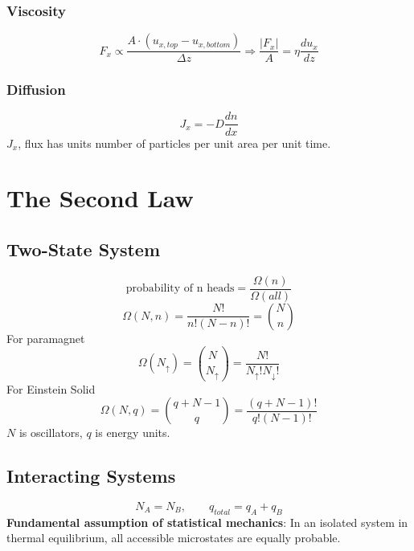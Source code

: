\documentclass[a4paper,norsk, 10pt]{article}
\begin{document}
\subsubsection{Viscosity}
\begin{equation}
F_x \propto \frac{A\cdot (u_{x,top}- u_{x,bottom})}{\Delta z} \Rightarrow \frac{|F_x|}{A} = \eta \frac{du_x}{dz}
\end{equation}

\subsubsection{Diffusion}
\begin{equation}
J_x = -D\frac{dn}{dx}
\end{equation}
$J_x$, flux has units number of particles per unit area per unit time.

\section{The Second Law}
\subsection{Two-State System}
\begin{equation}
\text{probability of n heads} = \frac{\Omega(n)}{\Omega(all)}
\end{equation}
\begin{equation}
\Omega(N,n) = \frac{N!}{n!(N-n)!} = \binom{N}{n}
\end{equation}
For paramagnet
\begin{equation}
\Omega(N_{\uparrow}) = \binom{N}{N_{\uparrow}} = \frac{N!}{N_\uparrow ! N_\downarrow !}
\end{equation}
For Einstein Solid
\begin{equation}
\Omega(N,q) = \binom{q+N-1}{q}=\frac{(q+N-1)!}{q!(N-1)!}
\end{equation}
$N$ is oscillators, $q$ is energy units.

\subsection{Interacting Systems}
\begin{equation}
N_A = N_B, \qquad q_{total} = q_A + q_B
\end{equation}
\textbf{Fundamental assumption of statistical mechanics}: In an isolated system in thermal equilibrium, all accessible microstates are equally probable.
\end{document}
